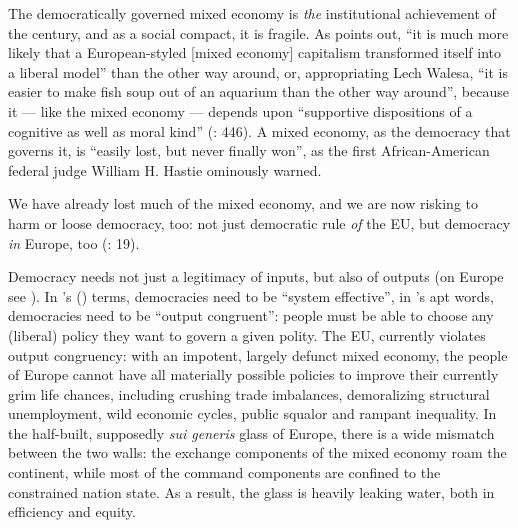 \documentclass[11pt,a4paper,oneside,openright]{article}
\begin{document}
The democratically governed mixed economy is \emph{the} institutional achievement of the century, and as a social compact, it is fragile. 
As \citeauthor{Offe2003} points out, ``it is much more likely that a European-styled [mixed economy] capitalism transformed itself into a liberal model'' than the other way around, or, appropriating Lech Walesa, ``it is easier to make fish soup out of an aquarium than the other way around'', because it --- like the mixed economy --- depends upon ``supportive dispositions of a cognitive as well as moral kind'' (\citeyear{Offe2003}: 446). 
A mixed economy, as the democracy that governs it, is ``easily lost, but never finally won'', as the first African-American federal judge William H. Hastie ominously warned. 

We have already lost much of the mixed economy, and we are now risking to harm or loose democracy, too: 
not just democratic rule \emph{of} the \gls{EU}, but democracy \emph{in} Europe, too (\citealt{Scharpf1997}: 19).

Democracy needs not just a legitimacy of inputs, but also of outputs (on Europe see \citealt{SchaGove1999}). 
In \citeauthor{Dahl-1994-ab}'s (\citeyear{Dahl-1994-ab}) terms, democracies need to be ``system effective'', in \citeauthor{Zurn-2000-aa}'s \citeyearpar{Zurn-2000-aa} apt words, democracies need to be ``output congruent'': 
people must be able to choose any (liberal) policy they want to govern a given polity. 
The \gls{EU}, currently violates output congruency: 
with an impotent, largely defunct mixed economy, the people of Europe cannot have all materially possible policies to improve their currently grim life chances, including crushing trade imbalances, demoralizing structural unemployment, wild economic cycles, public squalor and rampant inequality. 
In the half-built, supposedly \emph{sui generis} glass of Europe, there is a wide mismatch between the two walls: 
the exchange components of the mixed economy roam the continent, while most of the command components are confined to the constrained nation state. 
As a result, the glass is heavily leaking water, both in efficiency and equity.
\end{document}
